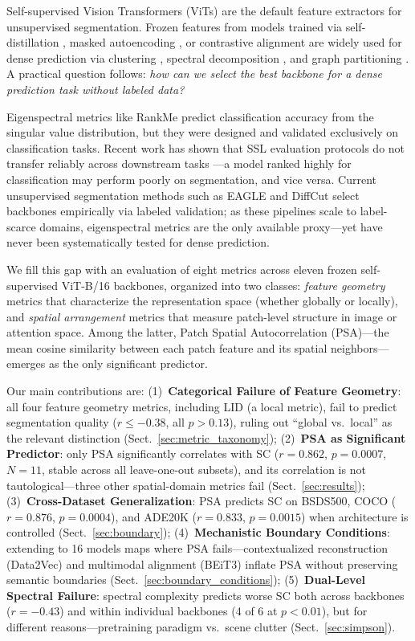 \documentclass[runningheads]{llncs}
\begin{document}
Self-supervised Vision Transformers (ViTs) are the default feature extractors for unsupervised segmentation. Frozen features from models trained via self-distillation \cite{caron2021}, masked autoencoding \cite{he2022}, or contrastive alignment \cite{radford2021} are widely used for dense prediction via clustering \cite{hamilton2022,curie2025}, spectral decomposition \cite{melas2022,kim2024eagle}, and graph partitioning \cite{couairon2024diffcut}. A practical question follows: \textit{how can we select the best backbone for a dense prediction task without labeled data?}

Eigenspectral metrics like RankMe \cite{garrido2023} predict classification accuracy from the singular value distribution, but they were designed and validated exclusively on classification tasks. Recent work has shown that SSL evaluation protocols do not transfer reliably across downstream tasks \cite{ijcv2025ssl}---a model ranked highly for classification may perform poorly on segmentation, and vice versa. Current unsupervised segmentation methods such as EAGLE \cite{kim2024eagle} and DiffCut \cite{couairon2024diffcut} select backbones empirically via labeled validation; as these pipelines scale to label-scarce domains, eigenspectral metrics are the only available proxy---yet have never been systematically tested for dense prediction.

We fill this gap with an evaluation of eight metrics across eleven frozen self-supervised ViT-B/16 backbones, organized into two classes: \emph{feature geometry} metrics that characterize the representation space (whether globally or locally), and \emph{spatial arrangement} metrics that measure patch-level structure in image or attention space. Among the latter, Patch Spatial Autocorrelation (PSA)---the mean cosine similarity between each patch feature and its spatial neighbors---emerges as the only significant predictor.

Our main contributions are: (1)~\textbf{Categorical Failure of Feature Geometry}: all four feature geometry metrics, including LID (a local metric), fail to predict segmentation quality ($r \leq -0.38$, all $p > 0.13$), ruling out ``global vs.\ local'' as the relevant distinction (Sect.~\ref{sec:metric_taxonomy}); (2)~\textbf{PSA as Significant Predictor}: only PSA significantly correlates with SC ($r=0.862$, $p=0.0007$, $N=11$, stable across all leave-one-out subsets), and its correlation is not tautological---three other spatial-domain metrics fail (Sect.~\ref{sec:results}); (3)~\textbf{Cross-Dataset Generalization}: PSA predicts SC on BSDS500, COCO ($r=0.876$, $p=0.0004$), and ADE20K ($r=0.833$, $p=0.0015$) when architecture is controlled (Sect.~\ref{sec:boundary}); (4)~\textbf{Mechanistic Boundary Conditions}: extending to 16 models maps where PSA fails---contextualized reconstruction (Data2Vec) and multimodal alignment (BEiT3) inflate PSA without preserving semantic boundaries (Sect.~\ref{sec:boundary_conditions}); (5)~\textbf{Dual-Level Spectral Failure}: spectral complexity predicts worse SC both across backbones ($r=-0.43$) and within individual backbones (4 of 6 at $p<0.01$), but for different reasons---pretraining paradigm vs.\ scene clutter (Sect.~\ref{sec:simpson}).
\end{document}
